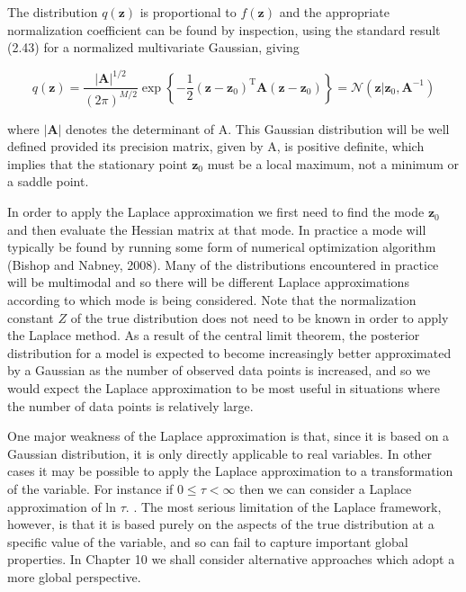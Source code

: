 \documentclass[
  10
]{article}
\begin{document}
The distribution \(q ( \mathbf { z } )\) is proportional to
\(f ( \mathbf { z } )\) and the appropriate normalization coefficient
can be found by inspection, using the standard result (2.43) for a
normalized multivariate Gaussian, giving

\[
q (\mathbf {z}) = \frac {| \mathbf {A} | ^ {1 / 2}}{(2 \pi) ^ {M / 2}} \exp \left\{- \frac {1}{2} (\mathbf {z} - \mathbf {z} _ {0}) ^ {\mathrm{T}} \mathbf {A} (\mathbf {z} - \mathbf {z} _ {0}) \right\} = \mathcal {N} (\mathbf {z} | \mathbf {z} _ {0}, \mathbf {A} ^ {- 1})\tag{4.134}
\]

where \(| \mathbf { A } |\) denotes the determinant of A. This Gaussian
distribution will be well defined provided its precision matrix, given
by A, is positive definite, which implies that the stationary point
\(\mathbf { z } _ { 0 }\) must be a local maximum, not a minimum or a
saddle point.

In order to apply the Laplace approximation we first need to find the
mode \(\mathbf { z } _ { 0 }\) and then evaluate the Hessian matrix at
that mode. In practice a mode will typically be found by running some
form of numerical optimization algorithm (Bishop and Nabney, 2008). Many
of the distributions encountered in practice will be multimodal and so
there will be different Laplace approximations according to which mode
is being considered. Note that the normalization constant \(Z\) of the
true distribution does not need to be known in order to apply the
Laplace method. As a result of the central limit theorem, the posterior
distribution for a model is expected to become increasingly better
approximated by a Gaussian as the number of observed data points is
increased, and so we would expect the Laplace approximation to be most
useful in situations where the number of data points is relatively
large.

One major weakness of the Laplace approximation is that, since it is
based on a Gaussian distribution, it is only directly applicable to real
variables. In other cases it may be possible to apply the Laplace
approximation to a transformation of the variable. For instance if
\(0 \leqslant \tau < \infty\) then we can consider a Laplace
approximation of ln \(\tau .\) . The most serious limitation of the
Laplace framework, however, is that it is based purely on the aspects of
the true distribution at a specific value of the variable, and so can
fail to capture important global properties. In Chapter 10 we shall
consider alternative approaches which adopt a more global perspective.
\end{document}
